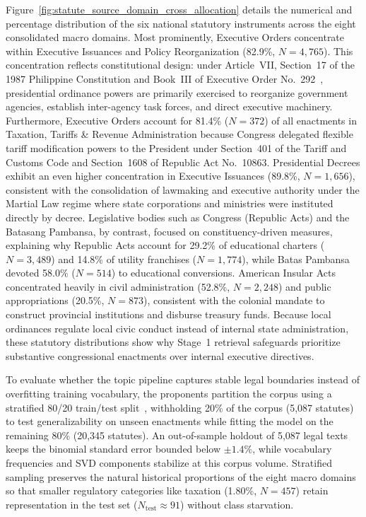        Figure~\ref{fig:statute_source_domain_cross_allocation} details the numerical and percentage distribution of the six national statutory instruments across the eight consolidated macro domains. Most prominently, Executive Orders concentrate within Executive Issuances and Policy Reorganization (82.9\%, $N=4,765$). This concentration reflects constitutional design: under Article~VII, Section~17 of the 1987 Philippine Constitution and Book~III of Executive Order No.~292~\cite{philgov1987eo292}, presidential ordinance powers are primarily exercised to reorganize government agencies, establish inter-agency task forces, and direct executive machinery. Furthermore, Executive Orders account for 81.4\% ($N=372$) of all enactments in Taxation, Tariffs \& Revenue Administration because Congress delegated flexible tariff modification powers to the President under Section~401 of the Tariff and Customs Code and Section~1608 of Republic Act No.~10863. Presidential Decrees exhibit an even higher concentration in Executive Issuances (89.8\%, $N=1,656$), consistent with the consolidation of lawmaking and executive authority under the Martial Law regime where state corporations and ministries were instituted directly by decree. Legislative bodies such as Congress (Republic Acts) and the Batasang Pambansa, by contrast, focused on constituency-driven measures, explaining why Republic Acts account for 29.2\% of educational charters ($N=3,489$) and 14.8\% of utility franchises ($N=1,774$), while Batas Pambansa devoted 58.0\% ($N=514$) to educational conversions. American Insular Acts concentrated heavily in civil administration (52.8\%, $N=2,248$) and public appropriations (20.5\%, $N=873$), consistent with the colonial mandate to construct provincial institutions and disburse treasury funds. Because local ordinances regulate local civic conduct instead of internal state administration, these statutory distributions show why Stage~1 retrieval safeguards prioritize substantive congressional enactments over internal executive directives.

        To evaluate whether the topic pipeline captures stable legal boundaries instead of overfitting training vocabulary, the proponents partition the corpus using a stratified 80/20 train/test split~\cite{manning2008introduction}, withholding 20\% of the corpus (5,087 statutes) to test generalizability on unseen enactments while fitting the model on the remaining 80\% (20,345 statutes). An out-of-sample holdout of 5,087 legal texts keeps the binomial standard error bounded below $\pm 1.4\%$, while vocabulary frequencies and SVD components stabilize at this corpus volume. Stratified sampling preserves the natural historical proportions of the eight macro domains so that smaller regulatory categories like taxation (1.80\%, $N=457$) retain representation in the test set ($N_{\text{test}} \approx 91$) without class starvation.

